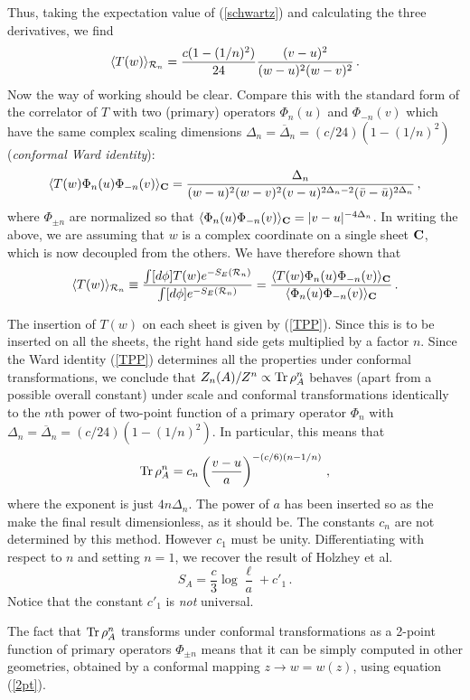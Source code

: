 \documentclass[12pt]{article}
\def\be{\begin{equation}}
\def\ee{\end{equation}}
\begin{document}
Thus, taking the expectation value of (\ref{schwartz}) and calculating the 
three derivatives, we find
\be
\langle T(w)\rangle_{{\cal R}_n}=
{c(1-(1/n)^2)\over 24}{(v-u)^2\over(w-u)^2(w-v)^2}\,.
\ee
Now the way of working should be clear.
Compare this with the standard form of the correlator of
$T$ with two (primary) operators $\Phi_n(u)$ and $\Phi_{-n}(v)$ which have
the same complex scaling dimensions 
$\Delta_n=\overline\Delta_n=(c/24)(1-(1/n)^2)$ ({\it conformal
Ward identity}):\cite{confbook}
\be
\label{TPP}
\langle T(w)\Phi_n(u)\Phi_{-n}(v)\rangle_{\bf C}=
{\Delta_n\over (w-u)^2(w-v)^2(v-u)^{2\Delta_n-2}
(\bar v-\bar u)^{2\Delta_n}}\,,
\ee
where $\Phi_{\pm n}$ are normalized so that
$\langle \Phi_n(u)\Phi_{-n}(v)\rangle_{\bf C}=|v-u|^{-4\Delta_n}$. 
In writing the above, we are assuming that $w$ is a complex coordinate
on a single sheet $\bf C$, which is now decoupled from the others.   
We have therefore shown that 
\begin{equation}
\langle T(w)\rangle_{{\cal R}_n}\equiv
{\int[d\phi]T(w)e^{-S_E({\cal R}_n)}\over
\int[d\phi]e^{-S_E({\cal R}_n)}}=
{\langle T(w)\Phi_n(u)\Phi_{-n}(v)\rangle_{\bf C}
\over \langle \Phi_n(u)\Phi_{-n}(v)\rangle_{\bf C}}\,.
\end{equation}

The insertion of $T(w)$ on each sheet is given by (\ref{TPP}).
Since this is to be inserted on all the sheets, the right hand side 
gets multiplied by 
a factor $n$.
Since the Ward identity (\ref{TPP}) determines all the properties under 
conformal transformations, we conclude that 
$Z_n({A})/Z^n\propto{\rm Tr}\,\rho_{A}^n$ behaves 
(apart from a possible overall constant)
under scale and conformal transformations identically to the $n$th power
of two-point function of a primary operator $\Phi_n$ with 
$\Delta_n=\overline\Delta_n=(c/24)(1-(1/n)^2)$. 
In particular, this means that
\be
{\rm Tr}\,\rho_{A}^n=c_n\left(\frac{v-u}{a}\right)^{-(c/6)(n-1/n)}\,,
\ee
where the exponent is just $4n\Delta_n$. 
The power of $a$ has been inserted so as the make the final result 
dimensionless, as it should be. 
The constants $c_n$ are not determined by this method. However $c_1$
must be unity. Differentiating with respect to $n$ and setting $n=1$, we
recover the result of Holzhey et al.\cite{Holzhey}
\be
S_A=\frac{c}{3}\log\frac{\ell}{a}+c'_1\,.
\ee
Notice that the constant $c'_1$ is {\it not} universal.


The fact that ${\rm Tr}\,\rho_{A}^n$ transforms under conformal 
transformations as a 2-point function of primary operators $\Phi_{\pm n}$
means that it can be simply computed in other geometries, obtained by a
conformal mapping $z\to w=w(z)$, using equation (\ref{2pt}).
\end{document}
